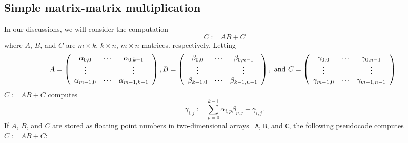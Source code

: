\subsection{Simple matrix-matrix multiplication}

In our discussions, we will consider the computation
$$C:=AB + C$$
where $A$, $B$, and $C$ are $m\times k$, $k\times n$, $m\times n$  matrices.
respectively. 
Letting 
{\footnotesize%
\[
A = 
\left( \begin{array}{c c c c}
\alpha_{0,0} & \cdots & \alpha_{0,k-1} \\
\vdots &  & \vdots \\
\alpha_{m-1,0} & \cdots & \alpha_{m-1,k-1} \\
\end{array}
\right),
B = 
\left( \begin{array}{c c c c}
\beta_{0,0} & \cdots & \beta_{0,n-1} \\
\vdots &  & \vdots \\
\beta_{k-1,0} & \cdots & \beta_{k-1,n-1} \\
\end{array}
\right), \mbox{~and~}
C = 
\left( \begin{array}{c c c c}
\gamma_{0,0} & \cdots & \gamma_{0,n-1} \\
\vdots &  & \vdots \\
\gamma_{m-1,0} & \cdots & \gamma_{m-1,n-1} \\
\end{array}
\right).
\]%
}
$ C := A B + C $ computes
\[
\gamma_{i,j} := \sum_{p=0}^{k-1} \alpha_{i,p} \beta_{p,j} +
\gamma_{i,j}.
\]
If $ A $, $ B $, and $ C $ are stored as floating point numbers in two-dimensional arrays {\tt
  A}, {\tt B}, and {\tt C}, 
the following pseudocode computes $ C := A B + C $:

